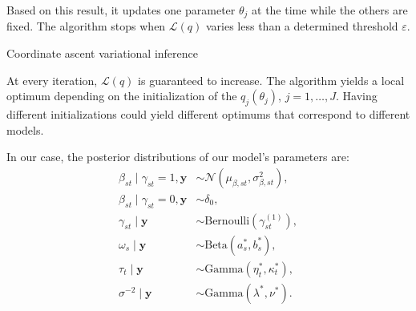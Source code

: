 \documentclass{article}
\numberwithin{equation}{section}
\begin{document}
Based on this result, it updates one parameter $\theta_j$ at the time while the others are fixed. The algorithm stops when $\mathcal{L}(q)$ varies less than a determined threshold $\varepsilon$.\\
\newline
\begin{algorithm}
\BlankLine
{}
\BlankLine
{}
\BlankLine
{}
\caption{Coordinate ascent variational inference \label{algo:CAVI}}
\end{algorithm}
At every iteration, $\mathcal{L}(q)$ is guaranteed to increase. The algorithm yields a local optimum depending on the initialization of the $q_j(\theta_j)$, $j=1,\ldots,J$. Having different initializations could yield different optimums that correspond to different models.

In our case, the posterior distributions of our model's parameters are:
\begin{align*}
\beta_{st} \mid \gamma_{st} = 1, \boldsymbol{y} &\sim \mathcal{N}\left(\mu_{\beta, st},\sigma^2_{\beta, st}\right),\\
\beta_{st} \mid \gamma_{st} = 0, \boldsymbol{y} &\sim \delta_0,\\
\gamma_{st} \mid \boldsymbol{y} &\sim \text{Bernoulli}(\gamma_{st}^{(1)}),\\
\omega_s\mid\boldsymbol{y} &\sim \text{Beta}(a_s^*,b_s^*),\\
\tau_t\mid \boldsymbol{y} &\sim \text{Gamma}(\eta^*_t, \kappa^*_t),\\
\sigma^{-2} \mid \boldsymbol{y} &\sim \text{Gamma}(\lambda^*, \nu^*).
\end{align*}
\end{document}
